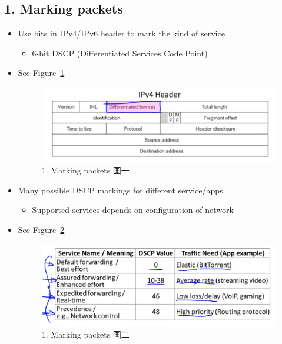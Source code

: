 \documentclass[12pt]{ctexart}   %
\begin{document}
	\subsection{{\color{blue} 1.} Marking packets}
	\begin{itemize}
		\item Use bits in IPv4/IPv6 header to mark the kind of service
		\begin{itemize}
			\item 6-bit DSCP (Differentiated Services Code Point)
		\end{itemize}
		\item See Figure~\ref{fig:9-6-4}
		  
		\begin{figure}[h!] %
		\centering
		\includegraphics[scale=0.7]{images/9-6-4}
		\caption{ 1. Marking packets 图一 }
		\label{fig:9-6-4}
		\end{figure}

		\item Many possible DSCP markings for different service/apps
		\begin{itemize}
			\item Supported services depends on configuration of network
		\end{itemize}
		\item See Figure~\ref{fig:9-6-5}
		  
		\begin{figure}[h!] %
		\centering
		\includegraphics[scale=0.7]{images/9-6-5}
		\caption{ 1. Marking packets 图二 }
		\label{fig:9-6-5}
		\end{figure}


\end{itemize}
\end{document}
